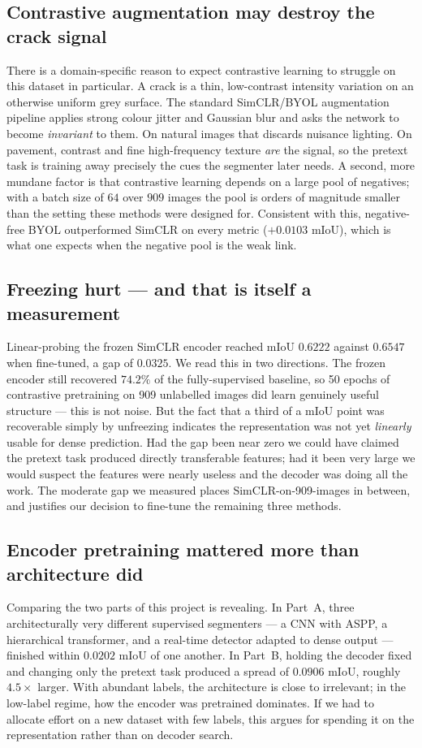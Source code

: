 \documentclass[conference]{IEEEtran}
\begin{document}
\subsection{Contrastive augmentation may destroy the crack signal}
There is a domain-specific reason to expect contrastive learning to struggle on this
dataset in particular. A crack is a thin, low-contrast intensity variation on an
otherwise uniform grey surface. The standard SimCLR/BYOL augmentation pipeline
applies strong colour jitter and Gaussian blur and asks the network to become
\emph{invariant} to them. On natural images that discards nuisance lighting. On
pavement, contrast and fine high-frequency texture \emph{are} the signal, so the
pretext task is training away precisely the cues the segmenter later needs. A second,
more mundane factor is that contrastive learning depends on a large pool of
negatives; with a batch size of $64$ over $909$ images the pool is orders of
magnitude smaller than the setting these methods were designed for. Consistent with
this, negative-free BYOL outperformed SimCLR on every metric ($+0.0103$ mIoU), which
is what one expects when the negative pool is the weak link.

\subsection{Freezing hurt --- and that is itself a measurement}
Linear-probing the frozen SimCLR encoder reached mIoU $0.6222$ against $0.6547$ when
fine-tuned, a gap of $0.0325$. We read this in two directions. The frozen encoder
still recovered $74.2\%$ of the fully-supervised baseline, so 50 epochs of contrastive
pretraining on 909 unlabelled images did learn genuinely useful structure --- this is
not noise. But the fact that a third of a mIoU point was recoverable simply by
unfreezing indicates the representation was not yet \emph{linearly} usable for dense
prediction. Had the gap been near zero we could have claimed the pretext task
produced directly transferable features; had it been very large we would suspect the
features were nearly useless and the decoder was doing all the work. The moderate gap
we measured places SimCLR-on-909-images in between, and justifies our decision to
fine-tune the remaining three methods.

\subsection{Encoder pretraining mattered more than architecture did}
Comparing the two parts of this project is revealing. In Part~A, three
architecturally very different supervised segmenters --- a CNN with ASPP, a
hierarchical transformer, and a real-time detector adapted to dense output ---
finished within $0.0202$ mIoU of one another. In Part~B, holding the decoder fixed
and changing only the pretext task produced a spread of $0.0906$ mIoU, roughly
$4.5\times$ larger. With abundant labels, the architecture is close to irrelevant;
in the low-label regime, how the encoder was pretrained dominates. If we had to
allocate effort on a new dataset with few labels, this argues for spending it on the
representation rather than on decoder search.
\end{document}
